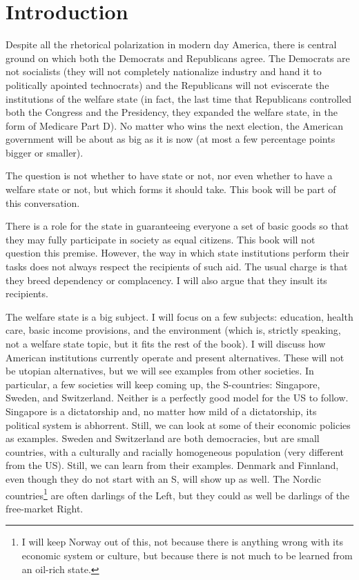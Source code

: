 \chapter{Introduction}

Despite all the rhetorical polarization in modern day America, there is central
ground on which both the Democrats and Republicans agree. The Democrats are not
socialists (they will not completely nationalize industry and hand it to
politically apointed technocrats) and the Republicans will not eviscerate the
institutions of the welfare state (in fact, the last time that Republicans
controlled both the Congress and the Presidency, they expanded the welfare
state, in the form of Medicare Part D). No matter who wins the next election,
the American government will be about as big as it is now (at most a few
percentage points bigger or smaller).

The question is not whether to have state or not, nor even whether to have a
welfare state or not, but which forms it should take. This book will be part of
this conversation.

There is a role for the state in guaranteeing everyone a set of basic goods so
that they may fully participate in society as equal citizens. This book will
not question this premise. However, the way in which state institutions perform
their tasks does not always respect the recipients of such aid. The usual
charge is that they breed dependency or complacency. I will also argue that
they insult its recipients.

\bigskip

The welfare state is a big subject. I will focus on a few subjects: education,
health care, basic income provisions, and the environment (which is, strictly
speaking, not a welfare state topic, but it fits the rest of the book). I will
discuss how American institutions currently operate and present alternatives.
These will not be utopian alternatives, but we will see examples from other
societies. In particular, a few societies will keep coming up, the S-countries:
Singapore, Sweden, and Switzerland. Neither is a perfectly good model for the
US to follow. Singapore is a dictatorship and, no matter how mild of a
dictatorship, its political system is abhorrent. Still, we can look at some of
their economic policies as examples. Sweden and Switzerland are both
democracies, but are small countries, with a culturally and racially
homogeneous population (very different from the US). Still, we can learn from
their examples. Denmark and Finnland, even though they do not start with an S,
will show up as well. The Nordic countries\footnote{I will keep Norway out of
this, not because there is anything wrong with its economic system or culture,
but because there is not much to be learned from an oil-rich state.} are often
darlings of the Left, but they could as well be darlings of the free-market
Right.

